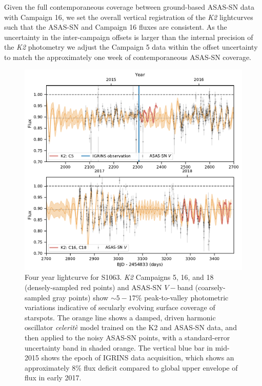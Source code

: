 \documentclass[twocolumn]{emulateapj}%
\begin{document}
Given the full contemporaneous coverage between ground-based ASAS-SN data with Campaign 16, we set the overall vertical registration of the \emph{K2} lightcurves such that the ASAS-SN and Campaign 16 fluxes are consistent. As the uncertainty in the inter-campaign offsets is larger than the internal precision of the \emph{K2} photometry we adjust the Campaign 5 data within the offset uncertainty to match the approximately one week of contemporaneous ASAS-SN coverage.


\begin{figure}[hbt!]
  \centering
  \includegraphics[width=7.0in]{figures/2020_K2_ASASSN_lcurve_2panel.pdf}
\caption{Four year lightcurve for S1063.  \emph{K2} Campaigns 5, 16, and 18 (densely-sampled red points) and ASAS-SN $V-$band (coarsely-sampled gray points) show $\sim5-17\%$ peak-to-valley photometric variations indicative of secularly evolving surface coverage of starspots.  The orange line shows a damped, driven harmonic oscillator \emph{celerit\`e} model \citep{2017AJ....154..220F} trained on the K2 and ASAS-SN data, and then applied to the noisy ASAS-SN points, with a standard-error uncertainty band in shaded orange.  The vertical blue bar in mid-2015 shows the epoch of IGRINS data acquisition, which shows an approximately $8\%$ flux deficit compared to global upper envelope of flux in early 2017.}
\label{fig:lightcurve}
\end{figure}
\end{document}
